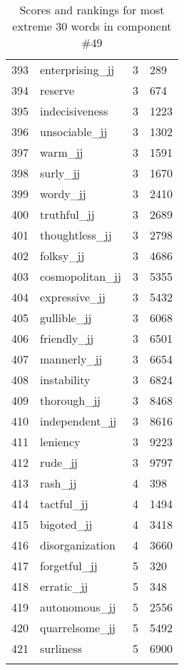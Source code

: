 \begin{longtable}[!htbp]{| rlr@{.}l |}
    393 & enterprising\_jj & 3 & 289 \\
    394 & reserve & 3 & 674 \\
    395 & indecisiveness & 3 & 1223 \\
    396 & unsociable\_jj & 3 & 1302 \\
    397 & warm\_jj & 3 & 1591 \\
    398 & surly\_jj & 3 & 1670 \\
    399 & wordy\_jj & 3 & 2410 \\
    400 & truthful\_jj & 3 & 2689 \\
    401 & thoughtless\_jj & 3 & 2798 \\
    402 & folksy\_jj & 3 & 4686 \\
    403 & cosmopolitan\_jj & 3 & 5355 \\
    404 & expressive\_jj & 3 & 5432 \\
    405 & gullible\_jj & 3 & 6068 \\
    406 & friendly\_jj & 3 & 6501 \\
    407 & mannerly\_jj & 3 & 6654 \\
    408 & instability & 3 & 6824 \\
    409 & thorough\_jj & 3 & 8468 \\
    410 & independent\_jj & 3 & 8616 \\
    411 & leniency & 3 & 9223 \\
    412 & rude\_jj & 3 & 9797 \\
    413 & rash\_jj & 4 & 398 \\
    414 & tactful\_jj & 4 & 1494 \\
    415 & bigoted\_jj & 4 & 3418 \\
    416 & disorganization & 4 & 3660 \\
    417 & forgetful\_jj & 5 & 320 \\
    418 & erratic\_jj & 5 & 348 \\
    419 & autonomous\_jj & 5 & 2556 \\
    420 & quarrelsome\_jj & 5 & 5492 \\
    421 & surliness & 5 & 6900 \\
    \hline
    \caption{Scores and rankings for most extreme 30 words in component \#49} \\
\end{longtable}
